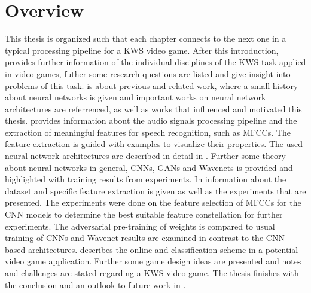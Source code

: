 
\section{Overview}\label{sec:intro_overview}
\thesisStateRevised
This thesis is organized such that each chapter connects to the next one in a typical processing pipeline for a KWS video game.
After this introduction,  provides further information of the individual disciplines of the KWS task applied in video games, futher some research questions are listed and give insight into problems of this task.
 is about previous and related work, where a small history about neural networks is given and important works on neural network architectures are referrenced, as well as works that influenced and motivated this thesis.
 provides information about the audio signals processing pipeline and the extraction of meaningful features for speech recognition, such as MFCCs.
The feature extraction is guided with examples to visualize their properties.
The used neural network architectures are described in detail in . 
Further some theory about neural networks in general, CNNs, GANs and Wavenets is provided and highlighted with training results from experiments.
In  information about the dataset and specific feature extraction is given as well as the experiments that are presented.
The experiments were done on the feature selection of MFCCs for the CNN models to determine the best suitable feature constellation for further experiments.
The adversarial pre-training of weights is compared to usual training of CNNs and Wavenet results are examined in contrast to the CNN based architectures.
 describes the online and classification scheme in a potential video game application.
Further some game design ideas are presented and notes and challenges are stated regarding a KWS video game.
The thesis finishes with the conclusion and an outlook to future work in .

